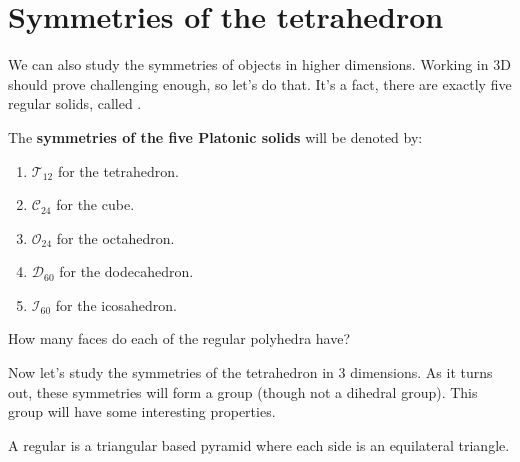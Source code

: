 \documentclass{ximera}
\begin{document}
\section{Symmetries of the tetrahedron}


We can also study the symmetries of objects in higher
dimensions. Working in $3$D should prove challenging enough, so let's
do that. It's a fact, there are exactly five regular solids, called
.

\begin{definition}
  The \textbf{symmetries of the five Platonic solids} will be denoted
  by:
  \begin{enumerate}
  \item $\mathcal{T}_{12}$ for the tetrahedron.
  \item $\mathcal{C}_{24}$ for the cube.
  \item $\mathcal{O}_{24}$ for the octahedron.
  \item $\mathcal{D}_{60}$ for the dodecahedron.
  \item $\mathcal{I}_{60}$ for the icosahedron.
  \end{enumerate}
\end{definition}

\begin{exercise}
  How many faces do each of the regular polyhedra have?
\end{exercise}


Now let's study the symmetries of the tetrahedron in $3$ dimensions.
As it turns out, these symmetries will form a group (though not a
dihedral group). This group will have some interesting properties.


A regular  is a triangular based pyramid where each
side is an equilateral triangle.
\end{document}
